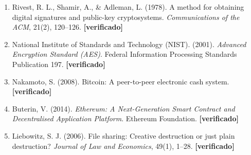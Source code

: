 \documentclass[12pt]{article}
\begin{document}
\begin{enumerate}
    \item Rivest, R. L., Shamir, A., \& Adleman, L. (1978). A method for obtaining digital signatures and public-key cryptosystems. \textit{Communications of the ACM}, 21(2), 120--126. \textbf{[verificado]}
    \item National Institute of Standards and Technology (NIST). (2001). \textit{Advanced Encryption Standard (AES)}. Federal Information Processing Standards Publication 197. \textbf{[verificado]}
    \item Nakamoto, S. (2008). Bitcoin: A peer-to-peer electronic cash system. \textbf{[verificado]}
    \item Buterin, V. (2014). \textit{Ethereum: A Next-Generation Smart Contract and Decentralised Application Platform}. Ethereum Foundation. \textbf{[verificado]}
    \item Liebowitz, S. J. (2006). File sharing: Creative destruction or just plain destruction? \textit{Journal of Law and Economics}, 49(1), 1--28. \textbf{[verificado]}
\end{enumerate}
\end{document}

